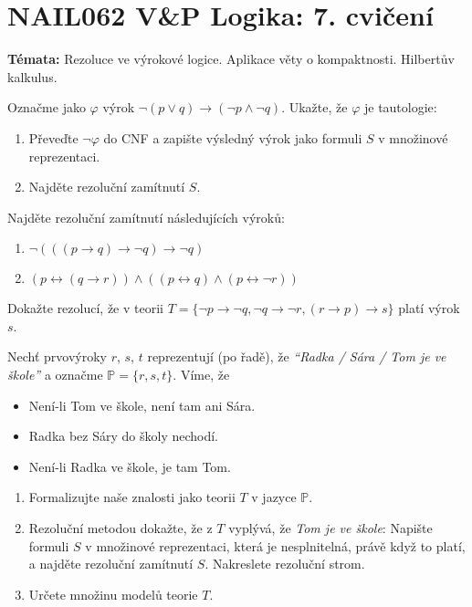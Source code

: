 \documentclass[a4paper,12pt]{article}
\begin{document}
\section*{NAIL062 V\&P Logika: 7. cvičení}



\textbf{Témata:}
Rezoluce ve výrokové logice. Aplikace věty o kompaktnosti. Hilbertův kalkulus.


\medskip\begin{problem}
    Označme jako $\varphi$ výrok $\neg (p \vee q) \to (\neg p \wedge \neg q)$. Ukažte, že $\varphi$ je tautologie:
    \begin{enumerate}
        \item Převeďte $\neg \varphi$ do CNF a zapište výsledný výrok jako formuli $S$ v množinové reprezentaci.
        \item Najděte rezoluční zamítnutí $S$.
    \end{enumerate}
    \end{problem}
    
    
    \medskip\begin{problem}
    Najděte rezoluční zamítnutí následujících výroků:
    \begin{enumerate}
        \item $\neg(((p\to q)\to \neg q)\to \neg q)$
        \item $(p\leftrightarrow (q\to r))\wedge((p\leftrightarrow q)\wedge(p\leftrightarrow \neg r))$
        
    \end{enumerate}
    \end{problem}
        
        
    \medskip\begin{problem}
    Dokažte rezolucí, že v teorii $T=\{\neg p \to \neg q,\neg q \to \neg r, (r\to p)\to s\}$ platí výrok $s$.
    \end{problem}
    
    
    \medskip\begin{problem}Nechť prvovýroky $r$, $s$, $t$  reprezentují (po řadě), že \emph{``Radka / Sára / Tom je ve škole''} a označme $\mathbb{P}=\{r,s,t\}$. Víme, že
        \begin{itemize}\it
        \item Není-li Tom ve škole, není tam ani Sára.
        \item Radka bez Sáry do školy nechodí.
        \item Není-li Radka ve škole, je tam Tom.
        \end{itemize}
        \begin{enumerate}
        \item Formalizujte naše znalosti jako teorii $T$ v jazyce $\mathbb P$.
        \item Rezoluční metodou dokažte, že z $T$ vyplývá, že \emph{Tom je ve škole}: Napište formuli $S$ v množinové reprezentaci, která je nesplnitelná, právě když to platí, a najděte rezoluční zamítnutí $S$. Nakreslete rezoluční strom.
        \item Určete množinu modelů teorie $T$.
        \end{enumerate}
    \end{problem}
    
\end{document}
